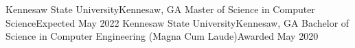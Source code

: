 \educationSubheading
{Kennesaw State University}{Kennesaw, GA}
{Master of Science in Computer Science}{Expected May 2022}
\educationSubheading
{Kennesaw State University}{Kennesaw, GA}
{Bachelor of Science in Computer Engineering (Magna Cum Laude)}{Awarded May 2020}
